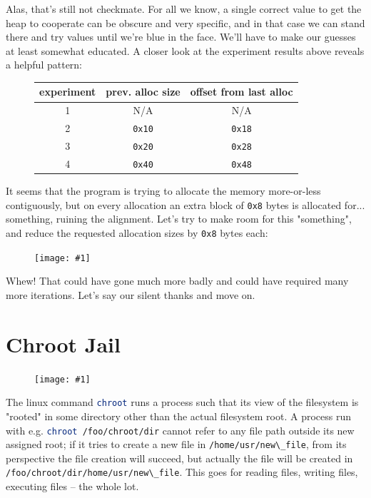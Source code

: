 \documentclass{article}
\newcommand{\displayimage}[1] {
\begin{figure}[H]
    \centering
    \texttt{[image: \#1]} 
\end{figure}
}
\newcommand{\wrapimageright}[1] {
    \begin{figure}
        \begin{center}
            \texttt{[image: \#1]} 
        \end{center}
    \end{figure}
}
\newcommand{\xcode}[2]{\colorbox{ubuntuback}{\lstinline[language=#1]|#2|}}
\newcommand{\code}[1]{\colorbox{ubuntuback}{\texttt{#1}}}
\begin{document}
Alas, that's still not checkmate. For all we know, a single correct value to get the heap to cooperate can be obscure and very specific, and in that case we can stand there and try values until we're blue in the face. We'll have to make our guesses at least somewhat educated. A closer look at the experiment results above reveals a helpful pattern:

\begin{figure}[H]
\centering
    \begin{tabular}{|c|c|c|} 
        \hline
        \textbf{experiment} & \textbf{prev. alloc size} & \textbf{offset from last alloc} \\
        \hline
        1 & N/A & N/A \\
        \hline
        2 & \code{0x10} & \code{0x18} \\
        \hline
        3 & \code{0x20} & \code{0x28} \\
        \hline
        4 & \code{0x40} & \code{0x48} \\
        \hline
\end{tabular}
\end{figure}

It seems that the program is trying to allocate the memory more-or-less contiguously, but on every allocation an extra block of \code{0x8} bytes is allocated for... something, ruining the alignment. Let's try to make room for this "something", and reduce the requested allocation sizes by \code{0x8} bytes each:

\displayimage{../16_memcpy/solution.png}

Whew! That could have gone much more badly and could have required many more iterations. Let's say our silent thanks and move on.

\section{Chroot Jail}

\wrapimageright{./images/chroot_jail.png}
The linux command \xcode{bash}{chroot} runs a process such that its view of the filesystem is "rooted" in some directory other than the actual filesystem root. A process run with e.g. \xcode{bash}{chroot /foo/chroot/dir} cannot refer to any file path outside its new assigned root; if it tries to create a new file in \xcode{bash}{/home/usr/new\_file}, from its perspective the file creation will succeed, but actually the file will be created in \xcode{bash}{/foo/chroot/dir/home/usr/new\_file}. This goes for reading files, writing files, executing files -- the whole lot. 
\end{document}
